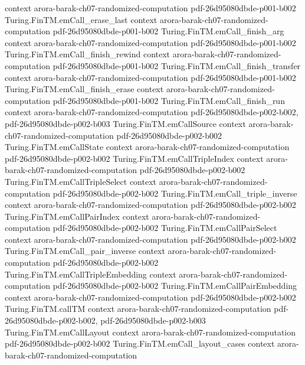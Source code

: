 \begin{theorem}
  {context}
  {arora-barak-ch07-randomized-computation}
  {pdf-26d95080dbde-p001-b002}
\proofstep
  {Turing.FinTM.emCall_erase_last}
  {context}
  {arora-barak-ch07-randomized-computation}
  {pdf-26d95080dbde-p001-b002}
\proofstep
  {Turing.FinTM.emCall_finish_arg}
  {context}
  {arora-barak-ch07-randomized-computation}
  {pdf-26d95080dbde-p001-b002}
\proofstep
  {Turing.FinTM.emCall_finish_rewind}
  {context}
  {arora-barak-ch07-randomized-computation}
  {pdf-26d95080dbde-p001-b002}
\proofstep
  {Turing.FinTM.emCall_finish_transfer}
  {context}
  {arora-barak-ch07-randomized-computation}
  {pdf-26d95080dbde-p001-b002}
\proofstep
  {Turing.FinTM.emCall_finish_erase}
  {context}
  {arora-barak-ch07-randomized-computation}
  {pdf-26d95080dbde-p001-b002}
\proofstep
  {Turing.FinTM.emCall_finish_run}
  {context}
  {arora-barak-ch07-randomized-computation}
  {pdf-26d95080dbde-p002-b002,
    pdf-26d95080dbde-p002-b003}
\proofstep
  {Turing.FinTM.emCallSource}
  {context}
  {arora-barak-ch07-randomized-computation}
  {pdf-26d95080dbde-p002-b002}
\proofstep
  {Turing.FinTM.emCallState}
  {context}
  {arora-barak-ch07-randomized-computation}
  {pdf-26d95080dbde-p002-b002}
\proofstep
  {Turing.FinTM.emCallTripleIndex}
  {context}
  {arora-barak-ch07-randomized-computation}
  {pdf-26d95080dbde-p002-b002}
\proofstep
  {Turing.FinTM.emCallTripleSelect}
  {context}
  {arora-barak-ch07-randomized-computation}
  {pdf-26d95080dbde-p002-b002}
\proofstep
  {Turing.FinTM.emCall_triple_inverse}
  {context}
  {arora-barak-ch07-randomized-computation}
  {pdf-26d95080dbde-p002-b002}
\proofstep
  {Turing.FinTM.emCallPairIndex}
  {context}
  {arora-barak-ch07-randomized-computation}
  {pdf-26d95080dbde-p002-b002}
\proofstep
  {Turing.FinTM.emCallPairSelect}
  {context}
  {arora-barak-ch07-randomized-computation}
  {pdf-26d95080dbde-p002-b002}
\proofstep
  {Turing.FinTM.emCall_pair_inverse}
  {context}
  {arora-barak-ch07-randomized-computation}
  {pdf-26d95080dbde-p002-b002}
\proofstep
  {Turing.FinTM.emCallTripleEmbedding}
  {context}
  {arora-barak-ch07-randomized-computation}
  {pdf-26d95080dbde-p002-b002}
\proofstep
  {Turing.FinTM.emCallPairEmbedding}
  {context}
  {arora-barak-ch07-randomized-computation}
  {pdf-26d95080dbde-p002-b002}
\proofstep
  {Turing.FinTM.callTM}
  {context}
  {arora-barak-ch07-randomized-computation}
  {pdf-26d95080dbde-p002-b002,
    pdf-26d95080dbde-p002-b003}
\proofstep
  {Turing.FinTM.emCallLayout}
  {context}
  {arora-barak-ch07-randomized-computation}
  {pdf-26d95080dbde-p002-b002}
\proofstep
  {Turing.FinTM.emCall_layout_cases}
  {context}
  {arora-barak-ch07-randomized-computation}

\end{theorem}
